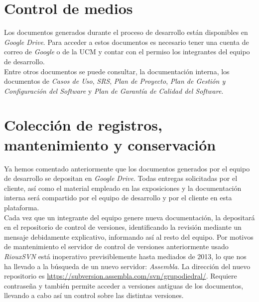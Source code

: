 \documentclass[11pt, a4paper, twoside, titlepage]{article}
\begin{document}
	\section{Control de medios} %
		Los documentos generados durante el proceso de desarrollo están disponibles en \textit{Google Drive}. Para acceder a estos documentos es necesario tener una cuenta de correo de \textit{Google} o de la UCM %
 y contar con el permiso los integrantes del equipo de desarrollo.\\

		Entre otros documentos se puede consultar, la documentación interna, los documentos de \textit{Casos de Uso}, \textit{SRS}, \textit{Plan de Proyecto}, \textit{Plan de Gestión y Configuración del Software} y \textit{Plan de Garantía de Calidad del Software}.


	\section{Colección de registros, mantenimiento y conservación} %
		Ya hemos comentado anteriormente que los documentos generados por el equipo de desarrollo se depositan en \textit{Google Drive}. Todas entregas solicitadas por el cliente, así como el material empleado en las exposiciones y la documentación interna será compartido por el equipo de desarrollo y por el cliente en esta plataforma. \\

		Cada vez que un integrante del equipo genere nueva documentación, la depositará en el repositorio de control de versiones,  identificando la revisión mediante un mensaje debidamente explicativo, informando así al resto del equipo. Por motivos de mantenimiento el servidor de control de versiones anteriormente usado \textit{RiouxSVN} está inoperativo previsiblemente hasta mediados de 2013, lo que nos ha llevado a la búsqueda de un nuevo servidor: \textit{Assembla}. La dirección del nuevo repositorio es \url{https://subversion.assembla.com/svn/grupodiedral/}. Requiere contraseña y también permite acceder a versiones antiguas de los documentos, llevando a cabo así un control sobre las distintas versiones.
\end{document}
